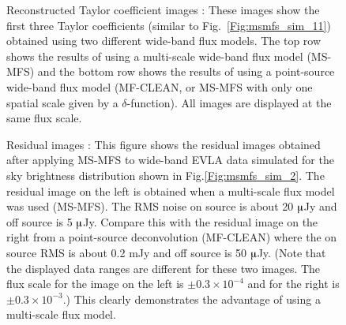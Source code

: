 \documentclass[structabstract]{stylefiles/aa}
\begin{document}
\begin{figure}
\caption[Example : Reconstructed Taylor coefficient images]
{\small Reconstructed Taylor coefficient images :
These images show the first three Taylor coefficients (similar to Fig.~\ref{Fig:msmfs_sim_11})
obtained using two different wide-band flux models.
The top row shows the results of using a multi-scale wide-band 
flux model (MS-MFS) and the bottom row shows the results of using a point-source wide-band flux model
(MF-CLEAN, or MS-MFS with only one spatial scale given by a $\delta$-function).
All images are displayed at the same flux scale.
}
\label{Fig:msmfs_sim_12}
\end{figure}

\begin{figure}[t!]
\begin{center}
\end{center}
\caption[Example : Residual images]
{\small Residual images : This figure shows the residual images obtained after
applying MS-MFS to wide-band EVLA data simulated for the
sky brightness distribution shown in Fig.\ref{Fig:msmfs_sim_2}.
The residual image on the left is obtained when a multi-scale flux model was used (MS-MFS). 
The RMS noise on source is about 20 $\muup$Jy and off source is 5 $\muup$Jy.  
Compare this with the residual image on the right from a point-source deconvolution (MF-CLEAN) where
the on source RMS is about 0.2 mJy and off source is 50 $\muup$Jy. 
(Note that the displayed data ranges are different for these two images.
 The flux scale for the image on the left is $\pm0.3 \times 10^{-4}$ and 
 for the right is $\pm0.3\times 10^{-3}$.)
This clearly demonstrates the advantage of using a
multi-scale flux model.
}
\label{Fig:msmfs_sim_3}
\end{figure}
\end{document}
